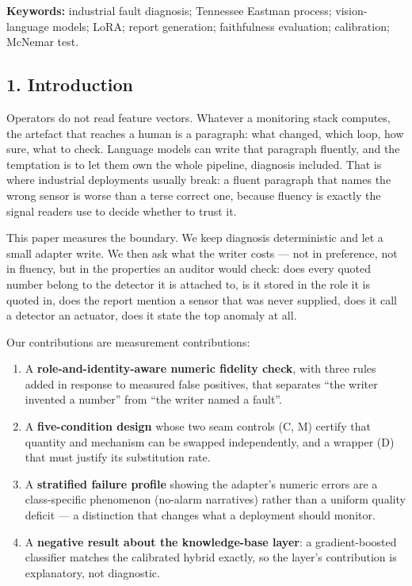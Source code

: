 \documentclass[
  10pt,
]{article}
\providecommand{\tightlist}{%
  \setlength{\itemsep}{0pt}\setlength{\parskip}{0pt}}
\begin{document}
\textbf{Keywords:} industrial fault diagnosis; Tennessee Eastman
process; vision-language models; LoRA; report generation; faithfulness
evaluation; calibration; McNemar test.

\subsection{1. Introduction}\label{introduction}

Operators do not read feature vectors. Whatever a monitoring stack
computes, the artefact that reaches a human is a paragraph: what
changed, which loop, how sure, what to check. Language models can write
that paragraph fluently, and the temptation is to let them own the whole
pipeline, diagnosis included. That is where industrial deployments
usually break: a fluent paragraph that names the wrong sensor is worse
than a terse correct one, because fluency is exactly the signal readers
use to decide whether to trust it.

This paper measures the boundary. We keep diagnosis deterministic and
let a small adapter write. We then ask what the writer costs --- not in
preference, not in fluency, but in the properties an auditor would
check: does every quoted number belong to the detector it is attached
to, is it stored in the role it is quoted in, does the report mention a
sensor that was never supplied, does it call a detector an actuator,
does it state the top anomaly at all.

Our contributions are measurement contributions:

\begin{enumerate}
\def\labelenumi{\arabic{enumi}.}
\tightlist
\item
  A \textbf{role-and-identity-aware numeric fidelity check}, with three
  rules added in response to measured false positives, that separates
  ``the writer invented a number'' from ``the writer named a fault''.
\item
  A \textbf{five-condition design} whose two seam controls (C, M)
  certify that quantity and mechanism can be swapped independently, and
  a wrapper (D) that must justify its substitution rate.
\item
  A \textbf{stratified failure profile} showing the adapter's numeric
  errors are a class-specific phenomenon (no-alarm narratives) rather
  than a uniform quality deficit --- a distinction that changes what a
  deployment should monitor.
\item
  A \textbf{negative result about the knowledge-base layer}: a
  gradient-boosted classifier matches the calibrated hybrid exactly, so
  the layer's contribution is explanatory, not diagnostic.
\end{enumerate}
\end{document}
